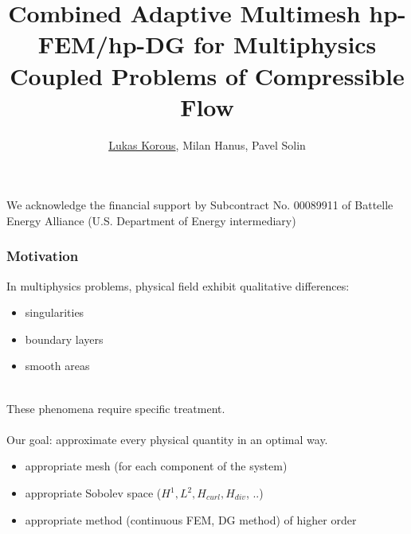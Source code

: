 \documentclass{beamer}
\title{Combined Adaptive Multimesh hp-FEM/hp-DG for Multiphysics Coupled Problems of Compressible Flow}
\author{\underline{Lukas Korous}, Milan Hanus, Pavel Solin}
\institute{University of Nevada, Reno}
\begin{document}
\begin{frame}
\titlepage
\end{frame}

\begin{frame}
We acknowledge the financial support by Subcontract No. 00089911 
of Battelle Energy Alliance (U.S. Department of Energy intermediary) 
\end{frame}

\begin{frame}
\frametitle{Motivation}
In multiphysics problems, physical field exhibit qualitative differences:\\
\begin{itemize}
\item singularities
\item boundary layers
\item smooth areas
\end{itemize}\ \\
These phenomena require specific treatment.\\\ \\
Our goal: approximate every physical quantity in an optimal way.\\
\begin{itemize}
	\item appropriate mesh (for each component of the system)
\item appropriate Sobolev space ($H^1, L^2, H_{curl}, H_{div}$, ..)
\item appropriate method (continuous FEM, DG method) of higher order
\end{itemize}
\end{frame}


\end{document}
